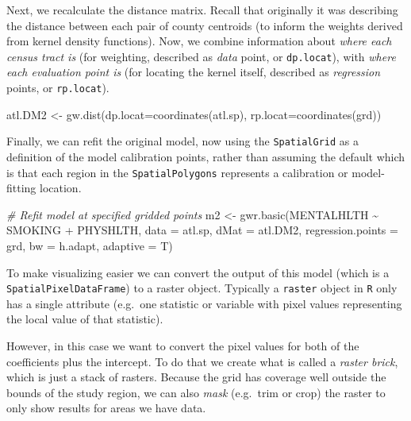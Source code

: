 \documentclass[
]{book}
\newenvironment{Shaded}{\begin{snugshade}}{\end{snugshade}}
\newcommand{\AttributeTok}[1]{\textcolor[rgb]{0.77,0.63,0.00}{#1}}
\newcommand{\CommentTok}[1]{\textcolor[rgb]{0.56,0.35,0.01}{\textit{#1}}}
\newcommand{\FunctionTok}[1]{\textcolor[rgb]{0.00,0.00,0.00}{#1}}
\newcommand{\NormalTok}[1]{#1}
\newcommand{\OtherTok}[1]{\textcolor[rgb]{0.56,0.35,0.01}{#1}}
\newcommand{\SpecialCharTok}[1]{\textcolor[rgb]{0.00,0.00,0.00}{#1}}
\begin{document}
Next, we recalculate the distance matrix. Recall that originally it was describing the distance between each pair of county centroids (to inform the weights derived from kernel density functions). Now, we combine information about \emph{where each census tract is} (for weighting, described as \emph{data} point, or \texttt{dp.locat}), with \emph{where each evaluation point is} (for locating the kernel itself, described as \emph{regression} points, or \texttt{rp.locat}).

\begin{Shaded}
\begin{Highlighting}[]
\NormalTok{atl.DM2 }\OtherTok{\textless{}{-}} \FunctionTok{gw.dist}\NormalTok{(}\AttributeTok{dp.locat=}\FunctionTok{coordinates}\NormalTok{(atl.sp),}
              \AttributeTok{rp.locat=}\FunctionTok{coordinates}\NormalTok{(grd))}
\end{Highlighting}
\end{Shaded}

Finally, we can refit the original model, now using the \texttt{SpatialGrid} as a definition of the model calibration points, rather than assuming the default which is that each region in the \texttt{SpatialPolygons} represents a calibration or model-fitting location.

\begin{Shaded}
\begin{Highlighting}[]
\CommentTok{\# Refit model at specified gridded points}
\NormalTok{m2 }\OtherTok{\textless{}{-}} \FunctionTok{gwr.basic}\NormalTok{(MENTALHLTH }\SpecialCharTok{\textasciitilde{}}\NormalTok{ SMOKING }\SpecialCharTok{+}\NormalTok{ PHYSHLTH, }
                \AttributeTok{data =}\NormalTok{ atl.sp,}
                \AttributeTok{dMat =}\NormalTok{ atl.DM2, }
                \AttributeTok{regression.points =}\NormalTok{ grd,}
                \AttributeTok{bw =}\NormalTok{ h.adapt,}
                \AttributeTok{adaptive =}\NormalTok{ T)}
\end{Highlighting}
\end{Shaded}

To make visualizing easier we can convert the output of this model (which is a \texttt{SpatialPixelDataFrame}) to a raster object. Typically a \texttt{raster} object in \texttt{R} only has a single attribute (e.g.~one statistic or variable with pixel values representing the local value of that statistic).

However, in this case we want to convert the pixel values for both of the coefficients plus the intercept. To do that we create what is called a \emph{raster brick}, which is just a stack of rasters. Because the grid has coverage well outside the bounds of the study region, we can also \emph{mask} (e.g.~trim or crop) the raster to only show results for areas we have data.
\end{document}
